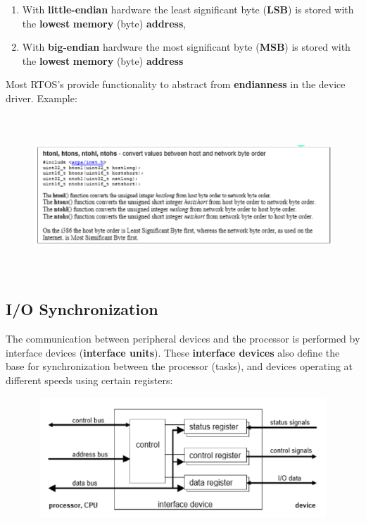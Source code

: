 \begin{enumerate}
\item  With \textbf{little-endian} hardware the least significant byte (\textbf{LSB}) is stored with the \textbf{lowest} \textbf{memory} (byte) \textbf{address}, 

\item  With \textbf{big-endian} hardware the most significant byte (\textbf{MSB}) is stored with the \textbf{lowest} \textbf{memory} (byte) \textbf{address}
\end{enumerate}

Most RTOS's provide functionality to abstract from \textbf{endianness} in the device driver. Example:

 	\begin{figure}[h]
    \centering
    \includegraphics[width=14cm, height=6cm]{Images/image121.png}
    \label{fig:Fig 70}
    \end{figure}

\subsection{I/O Synchronization}

The communication between peripheral devices and the processor is performed by interface devices\textbf{ }(\textbf{interface units}). These \textbf{interface devices} also define the base for synchronization between the processor (tasks), and devices operating at different speeds using certain registers:

 	\begin{figure}[h]
    \centering
    \includegraphics[width=12cm, height=4.5cm]{Images/image122.png}
    \label{fig:Fig 71}
    \end{figure}

